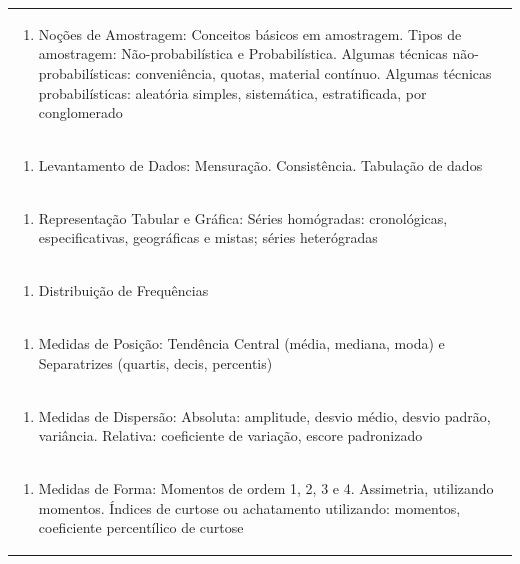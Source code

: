 \documentclass[11pt]{article}
\begin{document}
\begin{center}
\begin{longtable}{|p{4cm}|p{4cm}|p{4cm}|p{4cm}|}
\multicolumn{4}{|p{\dimexpr 16cm + 6\tabcolsep\relax}|}{\begin{enumerate}[start=2]\item Noções de Amostragem: Conceitos básicos em amostragem. Tipos de amostragem: Não-probabilística e Probabilística. Algumas técnicas não-probabilísticas: conveniência, quotas, material contínuo. Algumas técnicas probabilísticas: aleatória simples, sistemática, estratificada, por conglomerado\end{enumerate}}\\
\multicolumn{4}{|p{\dimexpr 16cm + 6\tabcolsep\relax}|}{\begin{enumerate}[start=3]\item Levantamento de Dados: Mensuração. Consistência. Tabulação de dados\end{enumerate}}\\
\multicolumn{4}{|p{\dimexpr 16cm + 6\tabcolsep\relax}|}{\begin{enumerate}[start=4]\item Representação Tabular e Gráfica: Séries homógradas: cronológicas, especificativas, geográficas e mistas; séries heterógradas\end{enumerate}}\\
\multicolumn{4}{|p{\dimexpr 16cm + 6\tabcolsep\relax}|}{\begin{enumerate}[start=5]\item Distribuição de Frequências\end{enumerate}}\\
\multicolumn{4}{|p{\dimexpr 16cm + 6\tabcolsep\relax}|}{\begin{enumerate}[start=6]\item Medidas de Posição: Tendência Central (média, mediana, moda) e Separatrizes (quartis, decis, percentis)\end{enumerate}}\\
\multicolumn{4}{|p{\dimexpr 16cm + 6\tabcolsep\relax}|}{\begin{enumerate}[start=7]\item Medidas de Dispersão: Absoluta: amplitude, desvio médio, desvio padrão, variância. Relativa: coeficiente de variação, escore padronizado\end{enumerate}}\\
\multicolumn{4}{|p{\dimexpr 16cm + 6\tabcolsep\relax}|}{\begin{enumerate}[start=8]\item Medidas de Forma: Momentos de ordem 1, 2, 3 e 4. Assimetria, utilizando momentos. Índices de curtose ou achatamento utilizando: momentos, coeficiente percentílico de curtose\end{enumerate}}\\

\end{longtable}
\end{center}
\end{document}
